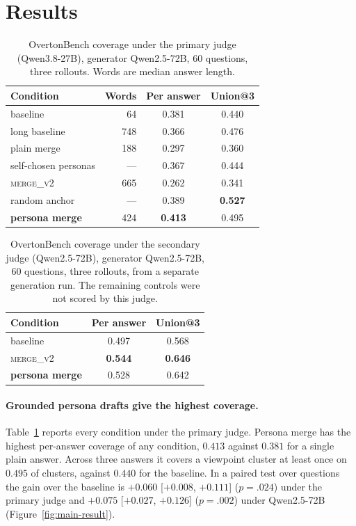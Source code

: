 \documentclass[11pt]{article}
\begin{document}
\section{Results}
\label{sec:results}

\begin{table}[t]
\centering
\small
\begin{tabular}{@{}lrcc@{}}
\toprule
Condition & Words & Per answer & Union@3 \\
\midrule
baseline             &  64 & 0.381 & 0.440 \\
long baseline        & 748 & 0.366 & 0.476 \\
plain merge          & 188 & 0.297 & 0.360 \\
self-chosen personas & --- & 0.367 & 0.444 \\
\textsc{merge\_v2}   & 665 & 0.262 & 0.341 \\
random anchor        & --- & 0.389 & \textbf{0.527} \\
\textbf{persona merge} & 424 & \textbf{0.413} & 0.495 \\
\bottomrule
\end{tabular}
\caption{OvertonBench coverage under the primary judge (Qwen3.8-27B),
generator Qwen2.5-72B, 60 questions, three rollouts. Words are median answer
length.}
\label{tab:main}
\end{table}

\begin{table}[t]
\centering
\small
\begin{tabular}{@{}lcc@{}}
\toprule
Condition & Per answer & Union@3 \\
\midrule
baseline               & 0.497 & 0.568 \\
\textsc{merge\_v2}     & \textbf{0.544} & \textbf{0.646} \\
\textbf{persona merge} & 0.528 & 0.642 \\
\bottomrule
\end{tabular}
\caption{OvertonBench coverage under the secondary judge (Qwen2.5-72B),
generator Qwen2.5-72B, 60 questions, three rollouts, from a separate generation
run. The remaining controls were not scored by this judge.}
\label{tab:secondary}
\end{table}

\paragraph{Grounded persona drafts give the highest coverage.}
Table~\ref{tab:main} reports every condition under the primary judge. Persona
merge has the highest per-answer coverage of any condition, $0.413$ against
$0.381$ for a single plain answer. Across three answers it covers a viewpoint
cluster at least once on $0.495$ of clusters, against $0.440$ for the
baseline. In a paired test over questions the gain over the baseline is
$+0.060$ [$+0.008$, $+0.111$] ($p = .024$) under the primary judge and $+0.075$
[$+0.027$, $+0.126$] ($p = .002$) under Qwen2.5-72B
(Figure~\ref{fig:main-result}).
\end{document}
